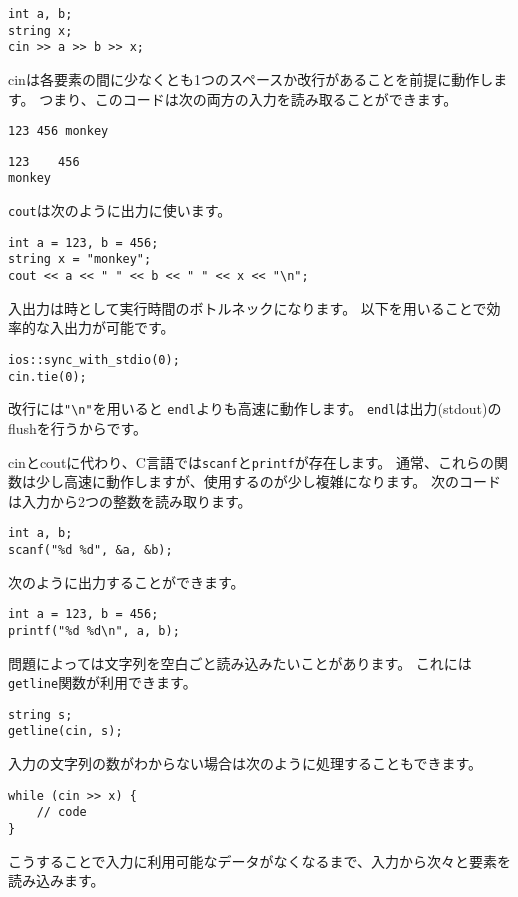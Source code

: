 \begin{lstlisting}
int a, b;
string x;
cin >> a >> b >> x;
\end{lstlisting}

cinは各要素の間に少なくとも1つのスペースか改行があることを前提に動作します。
つまり、このコードは次の両方の入力を読み取ることができます。

\begin{lstlisting}
123 456 monkey
\end{lstlisting}
\begin{lstlisting}
123    456
monkey
\end{lstlisting}
\texttt{cout}は次のように出力に使います。
\begin{lstlisting}
int a = 123, b = 456;
string x = "monkey";
cout << a << " " << b << " " << x << "\n";
\end{lstlisting}

入出力は時として実行時間のボトルネックになります。
以下を用いることで効率的な入出力が可能です。

\begin{lstlisting}
ios::sync_with_stdio(0);
cin.tie(0);
\end{lstlisting}

改行には\texttt{"\textbackslash n"}を用いると
\texttt{endl}よりも高速に動作します。
\texttt{endl}は出力(stdout)のflushを行うからです。

cinとcoutに代わり、C言語では\texttt{scanf}と\texttt{printf}が存在します。
通常、これらの関数は少し高速に動作しますが、使用するのが少し複雑になります。
次のコードは入力から2つの整数を読み取ります。
\begin{lstlisting}
int a, b;
scanf("%d %d", &a, &b);
\end{lstlisting}
次のように出力することができます。
\begin{lstlisting}
int a = 123, b = 456;
printf("%d %d\n", a, b);
\end{lstlisting}

問題によっては文字列を空白ごと読み込みたいことがあります。
これには\texttt{getline}関数が利用できます。

\begin{lstlisting}
string s;
getline(cin, s);
\end{lstlisting}

入力の文字列の数がわからない場合は次のように処理することもできます。
\begin{lstlisting}
while (cin >> x) {
    // code
}
\end{lstlisting}
こうすることで入力に利用可能なデータがなくなるまで、入力から次々と要素を読み込みます。

